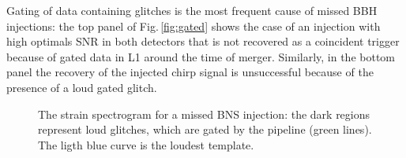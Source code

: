\documentclass[binding=0.6cm, LaM]{sapthesis}
\begin{document}
\begin{itemize}
            Gating of data containing glitches is the most frequent cause of missed BBH injections:
            the top panel of Fig.\,\ref{fig:gated} shows the case of an injection with high optimals SNR in both detectors that is not recovered as a coincident trigger because of gated data in L1 around the time of merger.
            Similarly, in the bottom panel the recovery of the injected chirp signal is unsuccessful because of the presence of a loud gated glitch.
        \end{itemize}
    	
        \begin{figure}[t]
          \noindent
          \label{gated_glitch}
          \centering
          \caption{The strain spectrogram for a missed BNS injection: the dark regions represent loud glitches, which are gated by the pipeline (green lines). The ligth blue curve is the loudest template.}
          \label{fig:gated_glitch}
        \end{figure}
\end{document}
